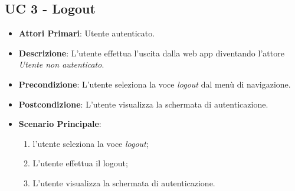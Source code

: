 		\subsection{UC 3 - Logout}
		\begin{itemize}
			\item \textbf{Attori Primari}: Utente autenticato.
			\item \textbf{Descrizione}: L'utente effettua l'uscita dalla web app diventando l'attore \textit{Utente non autenticato}.
			\item \textbf{Precondizione}: L'utente seleziona la voce \textit{logout} dal menù di navigazione.
			\item \textbf{Postcondizione}: L'utente visualizza la schermata di autenticazione.
			\item \textbf{Scenario Principale}:
			\begin{enumerate}
				\item l'utente seleziona la voce \textit{logout};
				\item L'utente effettua il logout;
				\item L'utente visualizza la schermata di autenticazione.
			\end{enumerate}	
		\end{itemize}


		


		



		


		



		


